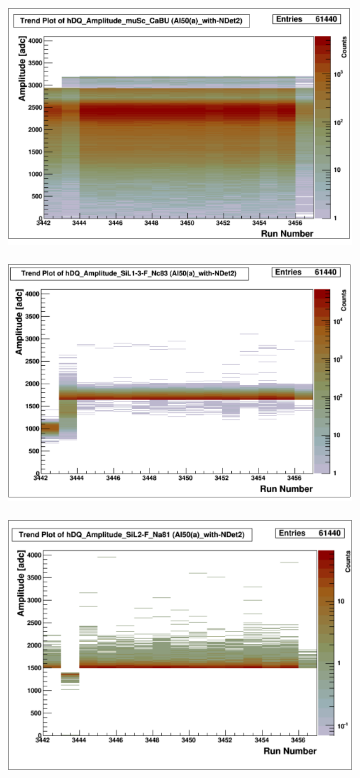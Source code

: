 \documentclass[a4paper]{article}
\begin{document}
\begin{figure}
  \centering
  \begin{subfigure}{0.5\textwidth}
    \includegraphics[width=0.9\linewidth]{figs/al50andet2/musc_amp}
  \end{subfigure}%
  \begin{subfigure}{0.5\textwidth}
    \includegraphics[width=0.9\linewidth]{figs/al50andet2/sil13f_amp}
  \end{subfigure}
  \begin{subfigure}{0.5\textwidth}
    \includegraphics[width=0.9\linewidth]{figs/al50andet2/sil2f_amp}

\end{subfigure}
\end{figure}
\end{document}
